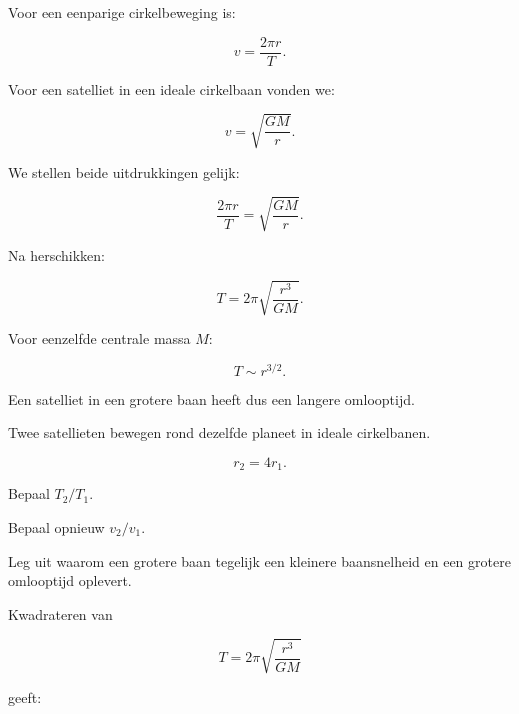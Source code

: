 \documentclass{ximera}
\begin{document}


Voor een eenparige cirkelbeweging is:

\[
v=\frac{2\pi r}{T}.
\]

Voor een satelliet in een ideale cirkelbaan vonden we:

\[
v=\sqrt{\frac{GM}{r}}.
\]

We stellen beide uitdrukkingen gelijk:

\[
\frac{2\pi r}{T}
=
\sqrt{\frac{GM}{r}}.
\]

Na herschikken:

\[
\boxed{
T
=
2\pi\sqrt{\frac{r^3}{GM}}.
}
\]

Voor eenzelfde centrale massa $M$:

\[
\boxed{
T\sim r^{3/2}.
}
\]

Een satelliet in een grotere baan heeft dus een langere omlooptijd.


\begin{oefening}{\oefU\ESS}

Twee satellieten bewegen rond dezelfde planeet in ideale cirkelbanen.

\[
r_2=4r_1.
\]

\begin{question}
Bepaal $T_2/T_1$.
\end{question}

\begin{question}
Bepaal opnieuw $v_2/v_1$.
\end{question}

\begin{question}
Leg uit waarom een grotere baan tegelijk een kleinere baansnelheid en
een grotere omlooptijd oplevert.
\end{question}

\end{oefening}




Kwadrateren van

\[
T
=
2\pi\sqrt{\frac{r^3}{GM}}
\]

geeft:
\end{document}
